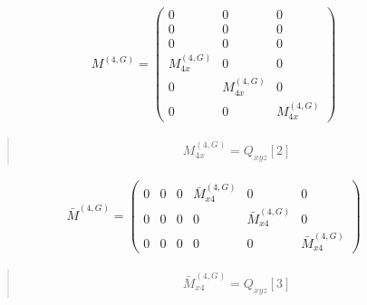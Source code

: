 \documentclass[fleqn,10pt]{jsarticle}
\begin{document}
\begin{align*}
M^{(4,G)} = \begin{pmatrix} 0 & 0 & 0 \\ 0 & 0 & 0 \\ 0 & 0 & 0 \\ M^{(4,G)}_{4x} & 0 & 0 \\ 0 & M^{(4,G)}_{4x} & 0 \\ 0 & 0 & M^{(4,G)}_{4x} \end{pmatrix}
\end{align*}
\begin{quote}
\begin{align*}
& M^{(4,G)}_{4x} = Q_{xyz}[2]
\end{align*}
\end{quote}
\begin{align*}
\bar{M}^{(4,G)} = \begin{pmatrix} 0 & 0 & 0 & \bar{M}^{(4,G)}_{x4} & 0 & 0 \\ 0 & 0 & 0 & 0 & \bar{M}^{(4,G)}_{x4} & 0 \\ 0 & 0 & 0 & 0 & 0 & \bar{M}^{(4,G)}_{x4} \end{pmatrix}
\end{align*}
\begin{quote}
\begin{align*}
& \bar{M}^{(4,G)}_{x4} = Q_{xyz}[3]
\end{align*}
\end{quote}
\end{document}
